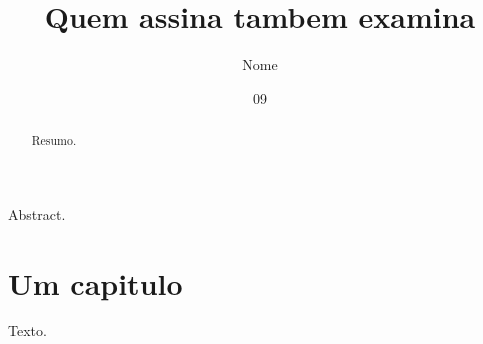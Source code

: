 \documentclass[dsc,orientadorexamina]{ufrj}
\title{Quem assina tambem examina}
\author{Nome}{Sobrenome}
\date{09}{2026}
\begin{document}
  \maketitle
  \frontmatter
  \begin{abstract}Resumo.\end{abstract}
  \begin{foreignabstract}Abstract.\end{foreignabstract}
  \tableofcontents
  \mainmatter
  \chapter{Um capitulo}
  Texto.
\end{document}
